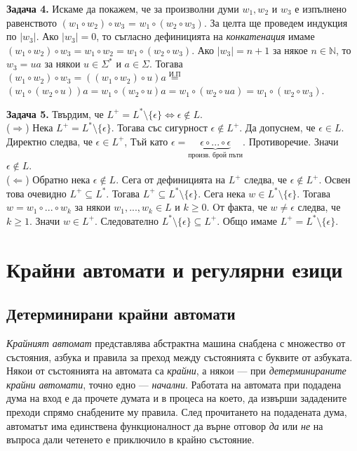 \documentclass[openany]{book}
\begin{document}
   \vspace{15pt}

   \textbf{Задача 4.} Искаме да покажем, че за произволни думи $w_1, w_2$ и $w_3$ е изпълнено равенството $(w_1 \circ w_2) \circ w_3$ = $w_1 \circ (w_2 \circ w_3)$. За целта ще проведем
   индукция по $|w_3|$. Ако $|w_3| = 0$, то съгласно дефиницията на \textit{конкатенация} имаме $(w_1 \circ w_2) \circ w_3 = w_1 \circ w_2 = w_1 \circ (w_2 \circ w_3)$.
   Ако $|w_3| = n + 1$ за някое $n \in \mathbb{N}$, то $w_3 = ua$ за някои $u \in \Sigma^*$ и $a \in \Sigma$. Тогава $(w_1 \circ w_2) \circ w_3 = ((w_1 \circ w_2) \circ u)a \stackrel{\text{И.П}}{=}$
   $(w_1 \circ (w_2 \circ u))a = w_1 \circ (w_2 \circ u)a = w_1 \circ (w_2 \circ ua) = w_1 \circ (w_2 \circ w_3)$.

   \vspace{15pt}

   \textbf{Задача 5.} Твърдим, че $L^+ = L^* \setminus \{\epsilon\} \iff \epsilon \notin L$. \\
   ($\Rightarrow$) Нека $L^+ = L^* \setminus \{\epsilon\}$. Тогава със сигурност $\epsilon \notin L^+$. Да допуснем, че $\epsilon \in L$. Директно следва, че $\epsilon \in L^+$, Тъй
   като $\epsilon = \underbrace{\epsilon \circ ... \circ \epsilon}_\text{произв. брой пъти}$. Противоречие. Значи $\epsilon \notin L$. \\
   ($\Leftarrow$) Обратно нека $\epsilon \notin L$. Сега от дефиницията на $L^+$ следва, че $\epsilon \notin L^+$. Освен това очевидно $L^+ \subseteq L^*$. Тогава $L^+ \subseteq L^* \setminus \{\epsilon\}$.
   Сега нека $w \in L^* \setminus \{\epsilon\}$. Тогава $w = w_1 \circ ... \circ w_k$ за някои $w_1,...,w_k \in L$ и $k \geq 0$. Oт факта, че $w \neq \epsilon$ следва, че $k \geq 1$.
   Значи $w \in L^+$. Следователно $L^* \setminus \{\epsilon\} \subseteq L^+$. Общо имаме $L^+ = L^* \setminus \{\epsilon\}$.

\vspace{15pt}

\chapter{Крайни автомати и регулярни езици}

\section{Детерминирани крайни автомати}
    \textit{Крайният автомат} представлява абстрактна машина снабдена с множество от състояния, азбука и правила за преход между състоянията с буквите от азбуката.
    Някои от състоянията на автомата са \textit{крайни}, а някои — при \textit{детерминираните крайни автомати}, точно едно — \textit{начални}. 
    Работата на автомата при подадена дума на вход е да прочете думата и в процеса на което, да извърши зададените преходи спрямо снабдените му правила. След
    прочитането на подадената дума, автоматът има единствена функционалност да върне отговор \textit{да} или \textit{не} на въпроса дали четенето е приключило в 
    крайно състояние.
    
\end{document}
